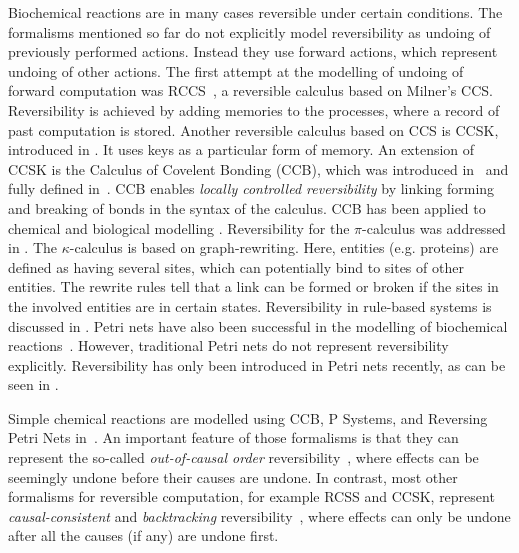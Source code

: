 Biochemical reactions are in many cases reversible under certain conditions. The formalisms mentioned so far do not explicitly model reversibility as undoing of previously performed actions. Instead they use forward actions, which represent undoing of other actions.
The first attempt at the modelling of undoing of forward computation was RCCS~\cite{10.1007/978-3-540-28644-8_19}, a reversible calculus based on Milner's CCS. Reversibility is achieved by adding memories to the processes, where a record of past computation is stored. Another reversible calculus based on CCS is CCSK, introduced in \cite{PhillipsUlidowski06,PHILLIPS200770}. It uses keys as a particular form of memory. An extension of CCSK is the Calculus of Covelent Bonding (CCB), which was introduced in~\cite{KU16} and fully defined in~\cite{KU2017}. CCB enables \textit{locally controlled reversibility} by linking forming and breaking of bonds in the syntax of the calculus. CCB has been applied to chemical and biological modelling \cite{10.1007/978-3-319-99498-7_8, Kuhn2020ReversibilityIC}. Reversibility for the $\pi$-calculus was addressed in \cite{10.1007/978-3-642-15375-4_33}. The $\kappa$-calculus \cite{DANOS200469} is based on graph-rewriting. Here, entities (e.g. proteins) are defined as having several sites, which can potentially bind to sites of other entities. The rewrite rules tell that a link can be formed or broken if the sites in the involved entities are in certain states. Reversibility in rule-based systems is discussed in \cite{Aman2020}. 
Petri nets have also been successful in the modelling of biochemical reactions~\cite{10.1007/978-3-540-68894-5_7}. However, traditional Petri nets do not represent reversibility explicitly. Reversibility has only been introduced in Petri nets recently, as can be seen in \cite{DBLP:conf/rc/PhilippouP18,DBLP:conf/apn/BarylskaGMPPP18,MelgrattiMU20,MelgrattiMPPU20,DBLP:journals/corr/abs-2010-04000}. 


Simple chemical reactions are modelled using CCB, P Systems, and Reversing Petri Nets in~\cite{Kuhn2020ReversibilityIC}. 
An important feature of those formalisms is that they can represent the so-called \emph{out-of-causal order} reversibility~\cite{Irek2012}, where effects can be seemingly undone before their causes are undone.
In contrast, most other formalisms for reversible computation, for example RCSS and CCSK, represent \emph{causal-consistent} and \emph{backtracking} reversibility~\cite{DK2007,LPU2020}, where effects can only be undone after all the causes (if any) are undone first.
